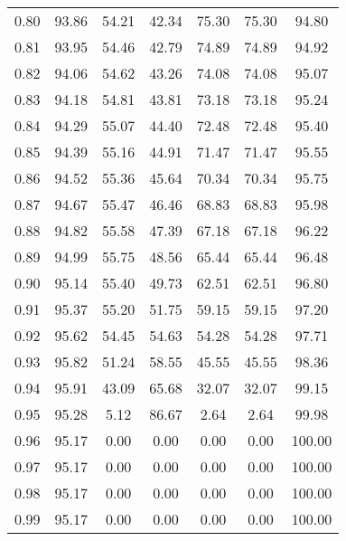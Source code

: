 \begin{tabular}{|c|c|c|c|c|c|c|}
      0.80 &     93.86 &     54.21 &      42.34 &   75.30 &      75.30 &         94.80 \\
      0.81 &     93.95 &     54.46 &      42.79 &   74.89 &      74.89 &         94.92 \\
      0.82 &     94.06 &     54.62 &      43.26 &   74.08 &      74.08 &         95.07 \\
      0.83 &     94.18 &     54.81 &      43.81 &   73.18 &      73.18 &         95.24 \\
      0.84 &     94.29 &     55.07 &      44.40 &   72.48 &      72.48 &         95.40 \\
      0.85 &     94.39 &     55.16 &      44.91 &   71.47 &      71.47 &         95.55 \\
      0.86 &     94.52 &     55.36 &      45.64 &   70.34 &      70.34 &         95.75 \\
      0.87 &     94.67 &     55.47 &      46.46 &   68.83 &      68.83 &         95.98 \\
      0.88 &     94.82 &     55.58 &      47.39 &   67.18 &      67.18 &         96.22 \\
      0.89 &     94.99 &     55.75 &      48.56 &   65.44 &      65.44 &         96.48 \\
      0.90 &     95.14 &     55.40 &      49.73 &   62.51 &      62.51 &         96.80 \\
      0.91 &     95.37 &     55.20 &      51.75 &   59.15 &      59.15 &         97.20 \\
      0.92 &     95.62 &     54.45 &      54.63 &   54.28 &      54.28 &         97.71 \\
      0.93 &     95.82 &     51.24 &      58.55 &   45.55 &      45.55 &         98.36 \\
      0.94 &     95.91 &     43.09 &      65.68 &   32.07 &      32.07 &         99.15 \\
      0.95 &     95.28 &      5.12 &      86.67 &    2.64 &       2.64 &         99.98 \\
      0.96 &     95.17 &      0.00 &       0.00 &    0.00 &       0.00 &        100.00 \\
      0.97 &     95.17 &      0.00 &       0.00 &    0.00 &       0.00 &        100.00 \\
      0.98 &     95.17 &      0.00 &       0.00 &    0.00 &       0.00 &        100.00 \\
      0.99 &     95.17 &      0.00 &       0.00 &    0.00 &       0.00 &        100.00 \\
\bottomrule
\end{tabular}
